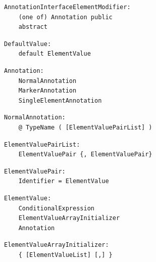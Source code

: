 \noindent\textbf{\texttt{}}\par
\begin{lstlisting}
AnnotationInterfaceElementModifier:
    (one of) Annotation public
    abstract
\end{lstlisting}

\noindent\textbf{\texttt{}}\par
\begin{lstlisting}
DefaultValue:
    default ElementValue
\end{lstlisting}

\noindent\textbf{\texttt{}}\par
\begin{lstlisting}
Annotation:
    NormalAnnotation
    MarkerAnnotation
    SingleElementAnnotation
\end{lstlisting}

\noindent\textbf{\texttt{}}\par
\begin{lstlisting}
NormalAnnotation:
    @ TypeName ( [ElementValuePairList] )
\end{lstlisting}

\noindent\textbf{\texttt{}}\par
\begin{lstlisting}
ElementValuePairList:
    ElementValuePair {, ElementValuePair}
\end{lstlisting}

\noindent\textbf{\texttt{}}\par
\begin{lstlisting}
ElementValuePair:
    Identifier = ElementValue
\end{lstlisting}

\noindent\textbf{\texttt{}}\par
\begin{lstlisting}
ElementValue:
    ConditionalExpression
    ElementValueArrayInitializer
    Annotation
\end{lstlisting}

\noindent\textbf{\texttt{}}\par
\begin{lstlisting}
ElementValueArrayInitializer:
    { [ElementValueList] [,] }
\end{lstlisting}

